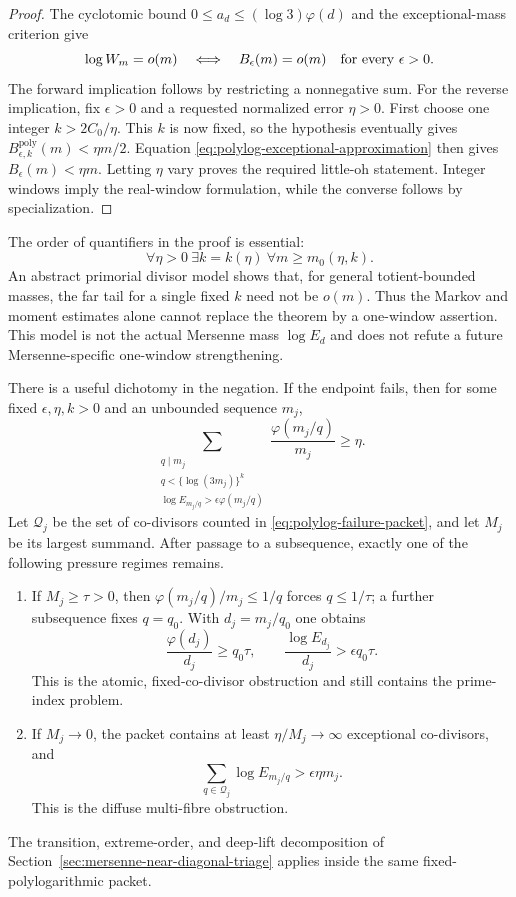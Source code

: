 \begin{proof}
The cyclotomic bound
$0\le a_d\le(\log3)\varphi(d)$ and the exceptional-mass criterion give
\[
 \log W_m=o(m)
 \quad\Longleftrightarrow\quad
 B_\epsilon(m)=o(m)\quad\hbox{for every }\epsilon>0.
\]
The forward implication follows by restricting a nonnegative sum.  For the
reverse implication, fix $\epsilon>0$ and a requested normalized error
$\eta>0$.  First choose one integer $k>2C_0/\eta$.  This $k$ is now fixed,
so the hypothesis eventually gives
$B^{\mathrm{poly}}_{\epsilon,k}(m)<\eta m/2$.  Equation
\eqref{eq:polylog-exceptional-approximation} then gives
$B_\epsilon(m)<\eta m$.  Letting $\eta$ vary proves the required little-oh
statement.  Integer windows imply the real-window formulation, while the
converse follows by specialization.
\end{proof}

The order of quantifiers in the proof is essential:
\[
 \forall\eta>0\ \exists k=k(\eta)\ \forall m\ge m_0(\eta,k).
\]
An abstract primorial divisor model shows that, for general
totient-bounded masses, the far tail for a single fixed $k$ need not be
$o(m)$.  Thus the Markov and moment estimates alone cannot replace the
theorem by a one-window assertion.  This model is not the actual Mersenne
mass $\log E_d$ and does not refute a future Mersenne-specific one-window
strengthening.

There is a useful dichotomy in the negation.  If the endpoint fails, then
for some fixed $\epsilon,\eta,k>0$ and an unbounded sequence $m_j$,
\begin{equation}\label{eq:polylog-failure-packet}
 \sum_{\substack{q\mid m_j\\q<\{\log(3m_j)\}^{k}\\
   \log E_{m_j/q}>\epsilon\varphi(m_j/q)}}
 \frac{\varphi(m_j/q)}{m_j}\ge\eta.
\end{equation}
Let $\mathcal Q_j$ be the set of co-divisors counted in
\eqref{eq:polylog-failure-packet}, and let $M_j$ be its largest summand.
After passage to a subsequence, exactly one of the following pressure
regimes remains.
\begin{enumerate}
\item If $M_j\ge\tau>0$, then
$\varphi(m_j/q)/m_j\le1/q$ forces $q\le1/\tau$; a further subsequence fixes
$q=q_0$.  With $d_j=m_j/q_0$ one obtains
\[
 \frac{\varphi(d_j)}{d_j}\ge q_0\tau,\qquad
 \frac{\log E_{d_j}}{d_j}>\epsilon q_0\tau.
\]
This is the atomic, fixed-co-divisor obstruction and still contains the
prime-index problem.
\item If $M_j\to0$, the packet contains at least $\eta/M_j\to\infty$
exceptional co-divisors, and
\[
             \sum_{q\in\mathcal Q_j}\log E_{m_j/q}
             >\epsilon\eta m_j.
\]
This is the diffuse multi-fibre obstruction.
\end{enumerate}
The transition, extreme-order, and deep-lift decomposition of
Section~\ref{sec:mersenne-near-diagonal-triage} applies inside the same
fixed-polylogarithmic packet.

